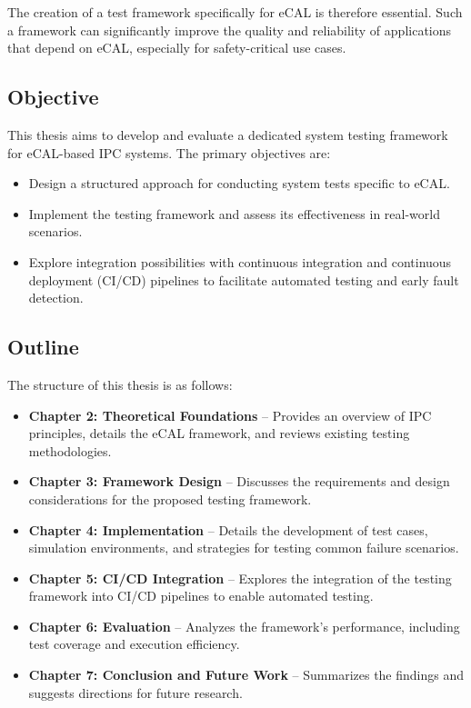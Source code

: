 The creation of a test framework specifically for eCAL is therefore essential. Such a framework can significantly improve the quality and reliability of applications that depend on eCAL, especially for safety-critical use cases.

\subsection{Objective}

This thesis aims to develop and evaluate a dedicated system testing framework for eCAL-based IPC systems. The primary objectives are:

\begin{itemize}
	\item Design a structured approach for conducting system tests specific to eCAL.
	\item Implement the testing framework and assess its effectiveness in real-world scenarios.
	\item Explore integration possibilities with continuous integration and continuous deployment (CI/CD) pipelines to facilitate automated testing and early fault detection.
\end{itemize}

\subsection{Outline}

The structure of this thesis is as follows:

\begin{itemize}
	\item \textbf{Chapter 2: Theoretical Foundations} – Provides an overview of IPC principles, details the eCAL framework, and reviews existing testing methodologies.
	\item \textbf{Chapter 3: Framework Design} – Discusses the requirements and design considerations for the proposed testing framework.
	\item \textbf{Chapter 4: Implementation} – Details the development of test cases, simulation environments, and strategies for testing common failure scenarios.
	\item \textbf{Chapter 5: CI/CD Integration} – Explores the integration of the testing framework into CI/CD pipelines to enable automated testing.
	\item \textbf{Chapter 6: Evaluation} – Analyzes the framework's performance, including test coverage and execution efficiency.
	\item \textbf{Chapter 7: Conclusion and Future Work} – Summarizes the findings and suggests directions for future research.
\end{itemize}






